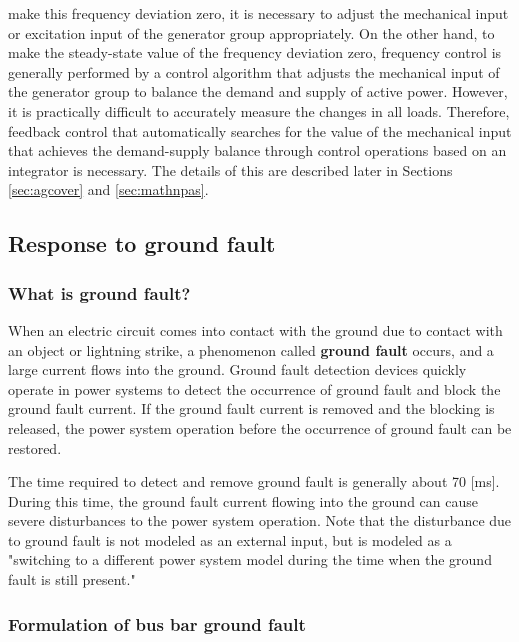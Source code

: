 \documentclass[graybox, envcountchap]{svmult}
\begin{document}
make this frequency deviation zero, it is necessary to adjust the mechanical
input or excitation input of the generator group appropriately. On the other
hand, to make the steady-state value of the frequency deviation zero, frequency
control is generally performed by a control algorithm that adjusts the
mechanical input of the generator group to balance the demand and supply of
active power. However, it is practically difficult to accurately measure the
changes in all loads. Therefore, feedback control that automatically searches
for the value of the mechanical input that achieves the demand-supply balance
through control operations based on an integrator is necessary. The details of
this are described later in Sections \ref{sec:agcover} and \ref{sec:mathnpas}.

\subsection{Response to ground fault}\label{sec:fault}

\smallskip
\subsubsection{What is ground fault?}

When an electric circuit comes into contact with the ground due to contact with
an object or lightning strike, a phenomenon called \textbf{ground fault} occurs,
and a large current flows into the ground. Ground fault detection devices
quickly operate in power systems to detect the occurrence of ground fault and
block the ground fault current. If the ground fault current is removed and the
blocking is released, the power system operation before the occurrence of ground
fault can be restored.

The time required to detect and remove ground fault is generally about 70 [ms].
During this time, the ground fault current flowing into the ground can cause
severe disturbances to the power system operation. Note that the disturbance due
to ground fault is not modeled as an external input, but is modeled as a
"switching to a different power system model during the time when the ground
fault is still present."

\smallskip
\subsubsection{Formulation of bus bar ground fault}
\end{document}
